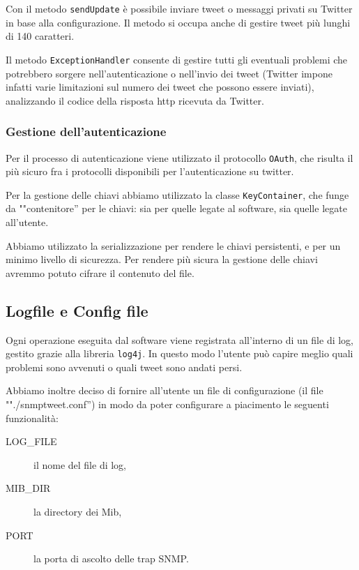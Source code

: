 \documentclass[a4paper, 10pt]{article}
\begin{document}
Con il metodo \texttt{sendUpdate} \`e possibile inviare tweet o messaggi privati su Twitter in base alla configurazione. Il metodo si occupa anche di gestire tweet pi\`u lunghi di 140 caratteri.

Il metodo \texttt{ExceptionHandler} consente di gestire tutti gli eventuali problemi che potrebbero sorgere nell'autenticazione o nell'invio dei tweet (Twitter impone infatti varie limitazioni sul numero dei tweet che possono essere inviati), analizzando il codice della risposta http ricevuta da Twitter.

\subsubsection{Gestione dell'autenticazione}

Per il processo di autenticazione viene utilizzato il protocollo \texttt{OAuth}, che risulta il pi\`u sicuro fra i protocolli disponibili per l'autenticazione su twitter.

Per la gestione delle chiavi abbiamo utilizzato la classe \texttt{KeyContainer}, che funge da ""contenitore'' per le chiavi: sia per quelle legate al software, sia quelle legate all'utente.

Abbiamo utilizzato la serializzazione per rendere le chiavi persistenti, e per un minimo livello di sicurezza. Per rendere pi\`u sicura la gestione delle chiavi avremmo potuto cifrare il contenuto del file.

\subsection{Logfile e Config file}

Ogni operazione eseguita dal software viene registrata all'interno di un file di log, gestito grazie alla libreria \texttt{log4j}. In questo modo l'utente pu\`o capire meglio quali problemi sono avvenuti o quali tweet sono andati persi.

Abbiamo inoltre deciso di fornire all'utente un file di configurazione (il file ""./snmptweet.conf'') in modo da poter configurare a piacimento le seguenti funzionalit\`a:

\begin{description}
	\item[LOG\_FILE] il nome del file di log,
	\item[MIB\_DIR] la directory dei Mib,
	\item[PORT] la porta di ascolto delle trap SNMP.
\end{description}
\end{document}
